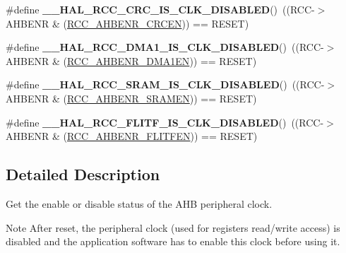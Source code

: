\begin{DoxyCompactItemize}
\item 
\mbox{\label{group___r_c_c___a_h_b___peripheral___clock___enable___disable___status_ga3d2645916b9ee9bad8c724a719c621d9}} 
\#define {\bfseries \+\_\+\+\_\+\+H\+A\+L\+\_\+\+R\+C\+C\+\_\+\+C\+R\+C\+\_\+\+I\+S\+\_\+\+C\+L\+K\+\_\+\+D\+I\+S\+A\+B\+L\+ED}()~((R\+CC-\/$>$A\+H\+B\+E\+NR \& (\hyperlink{group___peripheral___registers___bits___definition_gade3ee302bf659a2bfbf75e1a00630242}{R\+C\+C\+\_\+\+A\+H\+B\+E\+N\+R\+\_\+\+C\+R\+C\+EN}))   == R\+E\+S\+ET)
\item 
\mbox{\label{group___r_c_c___a_h_b___peripheral___clock___enable___disable___status_gae89d94d6252c79e450623f69eb939ed6}} 
\#define {\bfseries \+\_\+\+\_\+\+H\+A\+L\+\_\+\+R\+C\+C\+\_\+\+D\+M\+A1\+\_\+\+I\+S\+\_\+\+C\+L\+K\+\_\+\+D\+I\+S\+A\+B\+L\+ED}()~((R\+CC-\/$>$A\+H\+B\+E\+NR \& (\hyperlink{group___peripheral___registers___bits___definition_gac8c3053f1ce37c9f643f0e31471927ea}{R\+C\+C\+\_\+\+A\+H\+B\+E\+N\+R\+\_\+\+D\+M\+A1\+EN}))  == R\+E\+S\+ET)
\item 
\mbox{\label{group___r_c_c___a_h_b___peripheral___clock___enable___disable___status_ga44b59a52419512fd34d2d87190bf39c8}} 
\#define {\bfseries \+\_\+\+\_\+\+H\+A\+L\+\_\+\+R\+C\+C\+\_\+\+S\+R\+A\+M\+\_\+\+I\+S\+\_\+\+C\+L\+K\+\_\+\+D\+I\+S\+A\+B\+L\+ED}()~((R\+CC-\/$>$A\+H\+B\+E\+NR \& (\hyperlink{group___peripheral___registers___bits___definition_ga295a704767cb94ee624cbc4dd4c4cd9a}{R\+C\+C\+\_\+\+A\+H\+B\+E\+N\+R\+\_\+\+S\+R\+A\+M\+EN}))  == R\+E\+S\+ET)
\item 
\mbox{\label{group___r_c_c___a_h_b___peripheral___clock___enable___disable___status_gaeab36991bb98be402aae3d70b0887658}} 
\#define {\bfseries \+\_\+\+\_\+\+H\+A\+L\+\_\+\+R\+C\+C\+\_\+\+F\+L\+I\+T\+F\+\_\+\+I\+S\+\_\+\+C\+L\+K\+\_\+\+D\+I\+S\+A\+B\+L\+ED}()~((R\+CC-\/$>$A\+H\+B\+E\+NR \& (\hyperlink{group___peripheral___registers___bits___definition_ga67a12de126652d191a1bc2c114c3395a}{R\+C\+C\+\_\+\+A\+H\+B\+E\+N\+R\+\_\+\+F\+L\+I\+T\+F\+EN})) == R\+E\+S\+ET)
\end{DoxyCompactItemize}


\subsection{Detailed Description}
Get the enable or disable status of the A\+HB peripheral clock. 

\begin{DoxyNote}{Note}
After reset, the peripheral clock (used for registers read/write access) is disabled and the application software has to enable this clock before using it. 
\end{DoxyNote}
